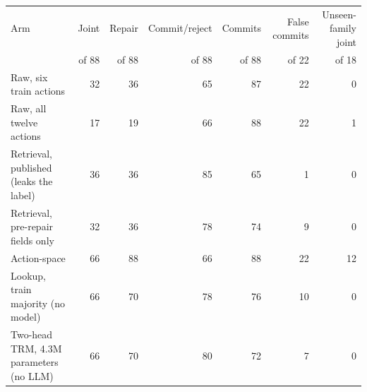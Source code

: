 \begin{tabular}{lrrrrrr}
\toprule
Arm & Joint & Repair & Commit/reject & Commits & False commits & Unseen-family joint \\
& of 88 & of 88 & of 88 & of 88 & of 22 & of 18 \\
\midrule
Raw, six train actions & 32 & 36 & 65 & 87 & 22 & 0 \\
Raw, all twelve actions & 17 & 19 & 66 & 88 & 22 & 1 \\
Retrieval, published (leaks the label) & 36 & 36 & 85 & 65 & 1 & 0 \\
Retrieval, pre-repair fields only & 32 & 36 & 78 & 74 & 9 & 0 \\
Action-space & 66 & 88 & 66 & 88 & 22 & 12 \\
Lookup, train majority (no model) & 66 & 70 & 78 & 76 & 10 & 0 \\
Two-head TRM, 4.3M parameters (no LLM) & 66 & 70 & 80 & 72 & 7 & 0 \\
\bottomrule
\end{tabular}
